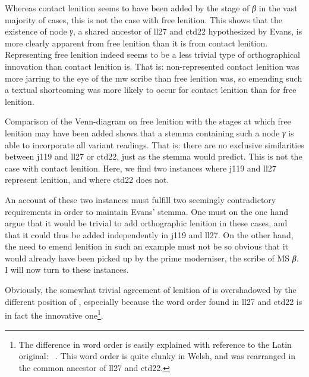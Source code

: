 Whereas contact lenition seems to have been added by the stage of \textit{β} in the vast majority of cases, this is not the case with free lenition. This shows that the existence of node \textit{γ}, a shared ancestor of \gls{ll27} and \gls{ctd22} hypothesized by Evans, is more clearly apparent from free lenition than it is from contact lenition. Representing free lenition indeed seems to be a less trivial type of orthographical innovation than contact lenition is. That is: non-represented contact lenition was more jarring to the eye of the \gls{mw} scribe than free lenition was, so emending such a textual shortcoming was more likely to occur for contact lenition than for free lenition.


Comparison of the Venn-diagram on free lenition with the stages at which free lenition may have been added shows that a stemma containing such a node \textit{γ} is able to incorporate all variant readings. That is: there are no exclusive similarities between \gls{j119} and \gls{ll27} or \gls{ctd22}, just as the stemma would predict. This is not the case with contact lenition. Here, we find two instances where \gls{j119} and \gls{ll27} represent lenition, and where \gls{ctd22} does not.

An account of these two instances must fulfill two seemingly contradictory requirements in order to maintain Evans' stemma. One must on the one hand argue that it would be trivial to add orthographic lenition in these cases, and that it could thus be added independently in \gls{j119} and \gls{ll27}. On the other hand, the need to emend lenition in such an example must not be so obvious that it would already have been picked up by the prime moderniser, the scribe of MS \textit{β}. I will now turn to these instances. 

\begin{mwl}
\end{mwl}
Obviously, the somewhat trivial agreement of lenition of  is overshadowed by the different position of , especially because the word order found in \gls{ll27} and \gls{ctd22} is in fact the innovative one\footnote{The difference in word order is easily explained with reference to the Latin original: ~\autocite[157]{Wad_Vitae13}. This word order is quite clunky in Welsh, and was rearranged in the common ancestor of \gls{ll27} and \gls{ctd22}.}. 


